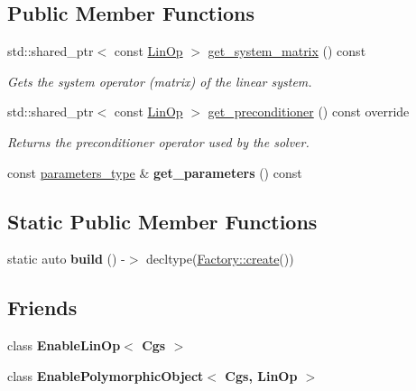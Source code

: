 \subsection*{Public Member Functions}
\begin{DoxyCompactItemize}
\item 
std\+::shared\+\_\+ptr$<$ const \hyperlink{classgko_1_1LinOp}{Lin\+Op} $>$ \hyperlink{classgko_1_1solver_1_1Cgs_aa537b2e6b7ccf95e96b4100866da1770}{get\+\_\+system\+\_\+matrix} () const
\begin{DoxyCompactList}\small\item\em Gets the system operator (matrix) of the linear system. \end{DoxyCompactList}\item 
std\+::shared\+\_\+ptr$<$ const \hyperlink{classgko_1_1LinOp}{Lin\+Op} $>$ \hyperlink{classgko_1_1solver_1_1Cgs_ad349dc1381dfdcb7a47223908806dcc7}{get\+\_\+preconditioner} () const override
\begin{DoxyCompactList}\small\item\em Returns the preconditioner operator used by the solver. \end{DoxyCompactList}\item 
\mbox{\label{classgko_1_1solver_1_1Cgs_a9ac2a7b0f0b14f3308be1988221c22d0}} 
const \hyperlink{structgko_1_1solver_1_1Cgs_1_1parameters__type}{parameters\+\_\+type} \& {\bfseries get\+\_\+parameters} () const
\end{DoxyCompactItemize}
\subsection*{Static Public Member Functions}
\begin{DoxyCompactItemize}
\item 
\mbox{\label{classgko_1_1solver_1_1Cgs_ace0362ace1d2d1fd2e6322af973bca08}} 
static auto {\bfseries build} () -\/$>$ decltype(\hyperlink{classgko_1_1EnableDefaultFactory_a1d077101d9e788e6c65f088612d14cc3}{Factory\+::create}())
\end{DoxyCompactItemize}
\subsection*{Friends}
\begin{DoxyCompactItemize}
\item 
\mbox{\label{classgko_1_1solver_1_1Cgs_abd9976d7b04021c8ba86dc8cd3c7c21b}} 
class {\bfseries Enable\+Lin\+Op$<$ Cgs $>$}
\item 
\mbox{\label{classgko_1_1solver_1_1Cgs_af58c1f415ba0ca2591898b3913acd0d2}} 
class {\bfseries Enable\+Polymorphic\+Object$<$ Cgs, Lin\+Op $>$}
\end{DoxyCompactItemize}


